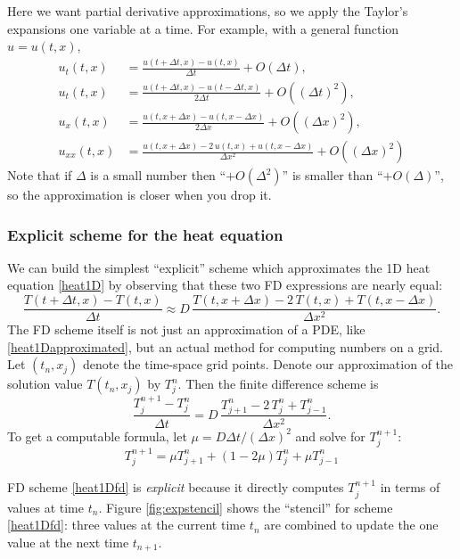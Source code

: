 \documentclass[letterpaper,final,12pt,reqno]{amsart}
\begin{document}
Here we want partial derivative approximations, so we apply the Taylor's expansions one variable at a time.  For example, with a general function $u=u(t,x)$,
\begin{align*}
u_t(t,x) &= \frac{u(t+\Delta t,x) - u(t,x)}{\Delta t} + O(\Delta t), \\
u_t(t,x) &= \frac{u(t+\Delta t,x) - u(t-\Delta t,x)}{2\Delta t} + O((\Delta t)^2), \\
u_x(t,x) &= \frac{u(t,x+\Delta x) - u(t,x-\Delta x)}{2\Delta x} + O((\Delta x)^2), \\
u_{xx}(t,x) &= \frac{u(t,x+\Delta x) - 2\, u(t,x) + u(t,x-\Delta x)}{\Delta x^2} + O((\Delta x)^2)
\end{align*}
Note that if $\Delta$ is a small number then ``$+O(\Delta^2)$'' is smaller than ``$+O(\Delta)$'', so the approximation is closer when you drop it.

\subsubsection*{Explicit scheme for the heat equation}  We can build the simplest ``explicit'' scheme which approximates the 1D heat equation \eqref{heat1D} by observing that these two FD expressions are nearly equal:
\begin{equation}
\frac{T(t+\Delta t,x) - T(t,x)}{\Delta t} \approx D\,\frac{T(t,x+\Delta x) - 2\, T(t,x) + T(t,x-\Delta x)}{\Delta x^2}.  \label{heat1Dapproximated}
\end{equation}
The FD scheme itself is not just an approximation of a PDE, like \eqref{heat1Dapproximated}, but an actual method for computing numbers on a grid.  Let $(t_n,x_j)$ denote the time-space grid points.  Denote our approximation of the solution value $T(t_n,x_j)$ by $T_j^n$.  Then the finite difference scheme is
	$$\frac{T_j^{n+1} - T_j^n}{\Delta t} = D\,\frac{T_{j+1}^n - 2\, T_j^n + T_{j-1}^n}{\Delta x^2}.$$
To get a computable formula, let $\mu = D \Delta t / (\Delta x)^2$ and solve for $T_j^{n+1}$:
\begin{equation}
  T_j^{n+1} = \mu T_{j+1}^n + (1 - 2 \mu) T_j^n + \mu T_{j-1}^n \label{heat1Dfd}
\end{equation}

FD scheme \eqref{heat1Dfd} is \emph{explicit} because it directly computes $T_j^{n+1}$ in terms of values at time $t_n$.  Figure \ref{fig:expstencil} shows the ``stencil'' for scheme \eqref{heat1Dfd}: three values at the current time $t_n$ are combined to update the one value at the next time $t_{n+1}$.
\end{document}
